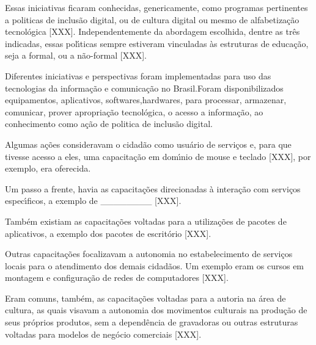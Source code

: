 \documentclass[
12pt,		%
openright,	%
twoside,  %
a4paper,			%
chapter=TITLE,		%
english,			%
french,				%
spanish,			%
brazil				%
]{USPSC-classe/USPSC_RedarTex}
\begin{document}
Essas iniciativas ficaram conhecidas, genericamente, como programas pertinentes a politicas de \textquotedbl inclus\~ao digital, ou  de \textquotedbl cultura digital ou mesmo de \textquotedbl alfabetiza\c{c}\~ao tecnol\'ogica [XXX]. Independentemente da abordagem escolhida, dentre as tr\^es indicadas, essas pol\'{\i}ticas sempre estiveram vinculadas \`as estruturas de educa\c{c}\~ao, seja a formal, ou a n\~ao-formal [XXX].








Diferentes iniciativas e perspectivas foram implementadas para uso das tecnologias da informa\c{c}\~ao e comunica\c{c}\~ao no Brasil.Foram disponibilizados equipamentos, aplicativos, softwares,hardwares, para processar, armazenar, comunicar, prover apropria\c{c}\~ao tecnol\'ogica, o acesso a  informa\c{c}\~ao, ao conhecimento como a\c{c}\~ao de politica de inclus\~ao digital.








Algumas a\c{c}\~oes consideravam o cidad\~ao como usu\'ario de servi\c{c}os e, para que tivesse acesso a eles, uma capacita\c{c}\~ao em dom\'{\i}nio de mouse e teclado [XXX], por exemplo, era oferecida.








Um passo a frente, havia as capacita\c{c}\~oes direcionadas \`a intera\c{c}\~ao com servi\c{c}os espec\'{\i}ficos, a exemplo de \_\_\_\_\_\_\_\_ [XXX].








Tamb\'em existiam as capacita\c{c}\~oes voltadas para a utiliza\c{c}\~oes de pacotes de aplicativos, a exemplo dos pacotes de escrit\'orio [XXX].








Outras capacita\c{c}\~oes focalizavam a autonomia no estabelecimento de servi\c{c}os locais para o atendimento dos demais cidad\~aos. Um exemplo eram os cursos em montagem e configura\c{c}\~ao de redes de computadores [XXX].








Eram comuns, tamb\'em, as capacita\c{c}\~oes voltadas para a autoria na \'area de cultura, as quais visavam a autonomia dos movimentos culturais na produ\c{c}\~ao de seus pr\'oprios produtos, sem a depend\^encia de gravadoras ou outras estruturas voltadas para modelos de neg\'ocio comerciais [XXX].
\end{document}

